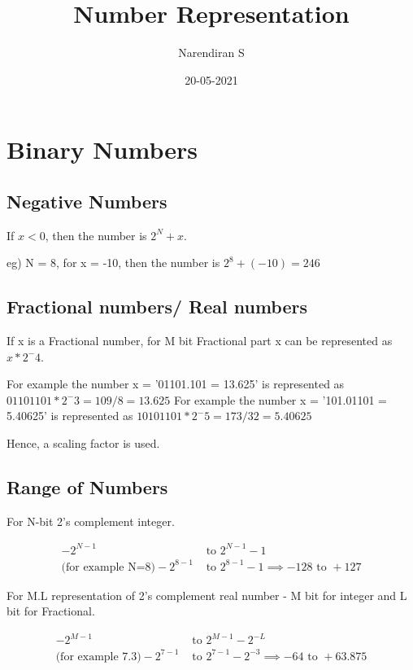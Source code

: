 \documentclass{article}
\title{Number Representation}
\author{Narendiran S}
\date{20-05-2021}
\begin{document}
\Large
\maketitle

\section{Binary Numbers}
\subsection{Negative Numbers}
If $x < 0$, then the number is $2^N + x$.

eg) N = 8, for x = -10, then the number is $2^8 + (-10) = 246$


\subsection{Fractional numbers/ Real numbers}
If x is a Fractional number, for M bit Fractional part x can be represented as $x*2^-4$.

For example the number x = '01101.101 = 13.625' is represented as $01101101 * 2^-3 = 109/8 = 13.625$
For example the number x = '101.01101 = 5.40625' is represented as $10101101 * 2^-5 = 173/32 = 5.40625$

Hence, a scaling factor is used.


\subsection{Range of Numbers}
For N-bit 2's complement integer.

\begin{align*}
    -2^{N-1}                          & \text{ to }  2^{N-1}-1                               \\
    \text{(for example N=8)} -2^{8-1} & \text{ to } 2^{8-1}-1 \implies -128 \text{ to } +127
\end{align*}

For M.L representation of 2's complement real number - M bit for integer and L bit for Fractional.

\begin{align*}
    -2^{M-1}                          & \text{ to }  2^{M-1} - 2^{-L}                               \\
    \text{(for example 7.3)} -2^{7-1} & \text{ to } 2^{7-1}-2^{-3} \implies -64 \text{ to } +63.875 \\
\end{align*}
\end{document}
